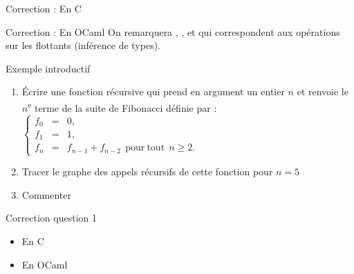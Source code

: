 \documentclass[10pt]{beamer}
\begin{document}
\begin{frame}[fragile]{\Ctitle}{\stitle}
	\begin{exampleblock}{Correction : En C}
	\end{exampleblock}
\end{frame}

\begin{frame}[fragile]{\Ctitle}{\stitle}
	\begin{exampleblock}{Correction : En OCaml}
		\onslide<2->On remarquera , , et  qui correspondent aux opérations sur les flottants (inférence de types).
	\end{exampleblock}
\end{frame}


\begin{frame}{\Ctitle}{\stitle}
	\begin{exampleblock}{Exemple introductif}
		\begin{enumerate}
			\item<1-> Écrire une fonction récursive qui prend en argument un entier $n$ et renvoie le $n$\textsuperscript{e} terme de la suite de Fibonacci définie par :
				$\left\{ \begin{array}{lll}
						f_0   & = & 0,                                                  \\
						f_1   & = & 1,                                                  \\
						f_{n} & = & f_{n-1}+f_{n-2} \mathrm{\ \ pour\ tout\ \ } n \geqslant 2.\end{array} \right.$
			\item<2-> Tracer le graphe des appels récursifs de cette fonction pour $n=5$
			\item<3-> Commenter
		\end{enumerate}
	\end{exampleblock}
\end{frame}



\begin{frame}{\Ctitle}{\stitle}
	\begin{exampleblock}{Correction question 1}
		\begin{itemize}
			\item <1-> En C
			\item<2-> En OCaml
		\end{itemize}
		
	\end{exampleblock}
\end{frame}
\end{document}
